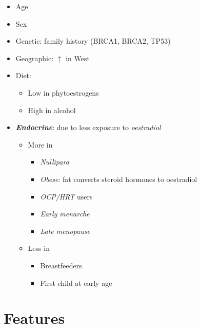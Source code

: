 \documentclass[
  12pt,
]{memoir}
\providecommand{\tightlist}{%
  \setlength{\itemsep}{0pt}\setlength{\parskip}{0pt}}
\begin{document}
\begin{itemize}
\tightlist
\item
  Age
\item
  Sex
\item
  Genetic: family history (BRCA1, BRCA2, TP53)
\item
  Geographic: \(\uparrow\) in West
\item
  Diet:

  \begin{itemize}
  \tightlist
  \item
    Low in phytoestrogens
  \item
    High in alcohol
  \end{itemize}
\item
  \textbf{\emph{Endocrine}}: due to less exposure to \emph{oestradiol}

  \begin{itemize}
  \tightlist
  \item
    More in

    \begin{itemize}
    \tightlist
    \item
      \emph{Nullipara}
    \item
      \emph{Obese}: fat converts steroid hormones to oestradiol
    \item
      \emph{OCP/HRT} users
    \item
      \emph{Early menarche}
    \item
      \emph{Late menopause}
    \end{itemize}
  \item
    Less in

    \begin{itemize}
    \tightlist
    \item
      Breastfeeders
    \item
      First child at early age
    \end{itemize}
  \end{itemize}
\end{itemize}

\hypertarget{features-2}{%
\section{Features}\label{features-2}}
\end{document}
